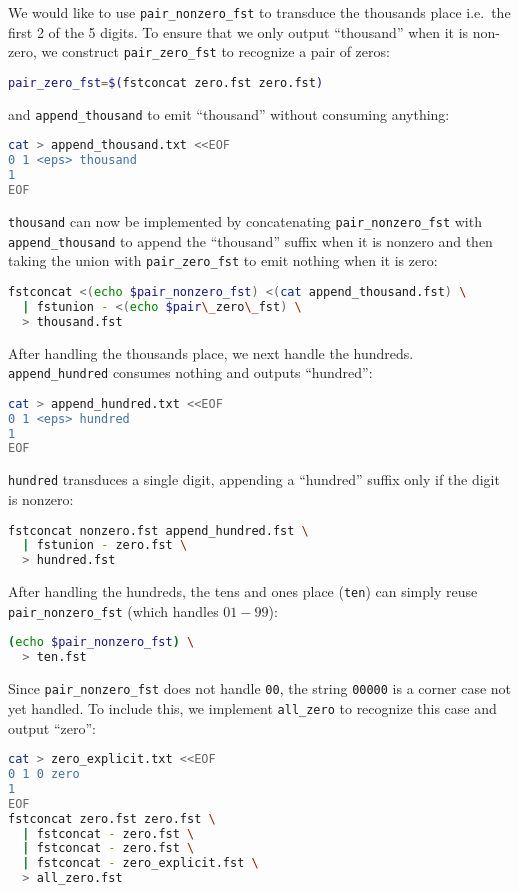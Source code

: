 \documentclass[a4paper,oneside,reqno]{amsart}
\begin{document}
\begin{enumerate}[label=\arabic*.]
    We would like to use \texttt{pair\_nonzero\_fst} to transduce the thousands
    place i.e.\ the first 2 of the 5 digits. To ensure that we only output
    ``thousand'' when it is non-zero, we construct \texttt{pair\_zero\_fst} to
    recognize a pair of zeros:
    \begin{lstlisting}[language=bash]
pair_zero_fst=$(fstconcat zero.fst zero.fst)
    \end{lstlisting}
    and \texttt{append\_thousand} to emit ``thousand'' without consuming anything:
    \begin{lstlisting}[language=bash]
cat > append_thousand.txt <<EOF
0 1 <eps> thousand
1
EOF
    \end{lstlisting}
    \texttt{thousand} can now be implemented by concatenating
    \texttt{pair\_nonzero\_fst} with \texttt{append\_thousand}
    to append the ``thousand'' suffix when it is nonzero and
    then taking the union with \texttt{pair\_zero\_fst} to emit nothing
    when it is zero:
    \begin{lstlisting}[language=bash]
fstconcat <(echo $pair_nonzero_fst) <(cat append_thousand.fst) \
  | fstunion - <(echo $pair\_zero\_fst) \
  > thousand.fst
    \end{lstlisting}

    After handling the thousands place, we next handle the hundreds. \texttt{append\_hundred}
    consumes nothing and outputs ``hundred'':
    \begin{lstlisting}[language=bash]
cat > append_hundred.txt <<EOF
0 1 <eps> hundred
1
EOF
    \end{lstlisting}
    \texttt{hundred} transduces a single digit, appending a ``hundred'' suffix only if
    the digit is nonzero:
    \begin{lstlisting}[language=bash]
fstconcat nonzero.fst append_hundred.fst \
  | fstunion - zero.fst \
  > hundred.fst
    \end{lstlisting}

    After handling the hundreds, the tens and ones place (\texttt{ten}) can
    simply reuse \texttt{pair\_nonzero\_fst} (which handles $01-99$):
    \begin{lstlisting}[language=bash]
(echo $pair_nonzero_fst) \
  > ten.fst
    \end{lstlisting}

    Since \texttt{pair\_nonzero\_fst} does not handle \texttt{00}, the string
    \texttt{00000} is a corner case not yet handled. To include this, we
    implement \texttt{all\_zero} to recognize this case and output ``zero'':
    \begin{lstlisting}[language=bash]
cat > zero_explicit.txt <<EOF
0 1 0 zero
1
EOF
fstconcat zero.fst zero.fst \
  | fstconcat - zero.fst \
  | fstconcat - zero.fst \
  | fstconcat - zero_explicit.fst \
  > all_zero.fst
    \end{lstlisting}


\end{enumerate}
\end{document}
